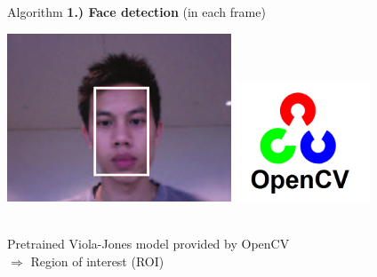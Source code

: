 \documentclass{beamer}
\begin{document}
\begin{frame}{Algorithm}
\textbf{\Large 1.) Face detection} (in each frame)\\
	\vspace{0.2cm}
	\begin{minipage}{\textwidth}
	\includegraphics[width=0.5\textwidth, align=c]{face_detection.png} \pause
	\hfill
	\includegraphics[width=0.3\textwidth, align=c]{OpenCV_Logo.png} \pause
	\end{minipage}\\
	\vspace{0.5cm}
	Pretrained Viola-Jones model provided by OpenCV\\ \pause
	\vspace{0.5cm}
	$\Rightarrow$ Region of interest (ROI)
\end{frame}
\end{document}
